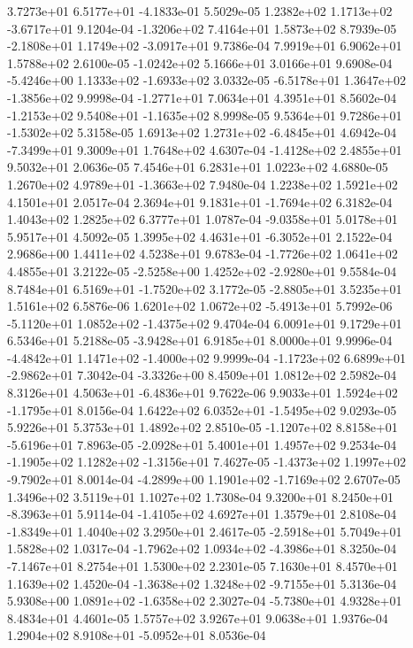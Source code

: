  3.7273e+01  6.5177e+01 -4.1833e-01  5.5029e-05
 1.2382e+02  1.1713e+02 -3.6717e+01  9.1204e-04
-1.3206e+02  7.4164e+01  1.5873e+02  8.7939e-05
-2.1808e+01  1.1749e+02 -3.0917e+01  9.7386e-04
7.9919e+01 6.9062e+01 1.5788e+02  2.6100e-05
-1.0242e+02  5.1666e+01  3.0166e+01  9.6908e-04
-5.4246e+00  1.1333e+02 -1.6933e+02  3.0332e-05
-6.5178e+01  1.3647e+02 -1.3856e+02  9.9998e-04
-1.2771e+01  7.0634e+01  4.3951e+01  8.5602e-04
-1.2153e+02  9.5408e+01 -1.1635e+02  8.9998e-05
 9.5364e+01  9.7286e+01 -1.5302e+02  5.3158e-05
 1.6913e+02  1.2731e+02 -6.4845e+01  4.6942e-04
-7.3499e+01  9.3009e+01  1.7648e+02  4.6307e-04
-1.4128e+02  2.4855e+01  9.5032e+01  2.0636e-05
7.4546e+01 6.2831e+01 1.0223e+02  4.6880e-05
 1.2670e+02  4.9789e+01 -1.3663e+02  7.9480e-04
1.2238e+02 1.5921e+02 4.1501e+01  2.0517e-04
 2.3694e+01  9.1831e+01 -1.7694e+02  6.3182e-04
1.4043e+02 1.2825e+02 6.3777e+01  1.0787e-04
-9.0358e+01  5.0178e+01  5.9517e+01  4.5092e-05
 1.3995e+02  4.4631e+01 -6.3052e+01  2.1522e-04
2.9686e+00 1.4411e+02 4.5238e+01  9.6783e-04
-1.7726e+02  1.0641e+02  4.4855e+01  3.2122e-05
-2.5258e+00  1.4252e+02 -2.9280e+01  9.5584e-04
 8.7484e+01  6.5169e+01 -1.7520e+02  3.1772e-05
-2.8805e+01  3.5235e+01  1.5161e+02  6.5876e-06
 1.6201e+02  1.0672e+02 -5.4913e+01  5.7992e-06
-5.1120e+01  1.0852e+02 -1.4375e+02  9.4704e-04
6.0091e+01 9.1729e+01 6.5346e+01  5.2188e-05
-3.9428e+01  6.9185e+01  8.0000e+01  9.9996e-04
-4.4842e+01  1.1471e+02 -1.4000e+02  9.9999e-04
-1.1723e+02  6.6899e+01 -2.9862e+01  7.3042e-04
-3.3326e+00  8.4509e+01  1.0812e+02  2.5982e-04
 8.3126e+01  4.5063e+01 -6.4836e+01  9.7622e-06
 9.9033e+01  1.5924e+02 -1.1795e+01  8.0156e-04
 1.6422e+02  6.0352e+01 -1.5495e+02  9.0293e-05
5.9226e+01 5.3753e+01 1.4892e+02  2.8510e-05
-1.1207e+02  8.8158e+01 -5.6196e+01  7.8963e-05
-2.0928e+01  5.4001e+01  1.4957e+02  9.2534e-04
-1.1905e+02  1.1282e+02 -1.3156e+01  7.4627e-05
-1.4373e+02  1.1997e+02 -9.7902e+01  8.0014e-04
-4.2899e+00  1.1901e+02 -1.7169e+02  2.6707e-05
1.3496e+02 3.5119e+01 1.1027e+02  1.7308e-04
 9.3200e+01  8.2450e+01 -8.3963e+01  5.9114e-04
-1.4105e+02  4.6927e+01  1.3579e+01  2.8108e-04
-1.8349e+01  1.4040e+02  3.2950e+01  2.4617e-05
-2.5918e+01  5.7049e+01  1.5828e+02  1.0317e-04
-1.7962e+02  1.0934e+02 -4.3986e+01  8.3250e-04
-7.1467e+01  8.2754e+01  1.5300e+02  2.2301e-05
7.1630e+01 8.4570e+01 1.1639e+02  1.4520e-04
-1.3638e+02  1.3248e+02 -9.7155e+01  5.3136e-04
 5.9308e+00  1.0891e+02 -1.6358e+02  2.3027e-04
-5.7380e+01  4.9328e+01  8.4834e+01  4.4601e-05
1.5757e+02 3.9267e+01 9.0638e+01  1.9376e-04
 1.2904e+02  8.9108e+01 -5.0952e+01  8.0536e-04
